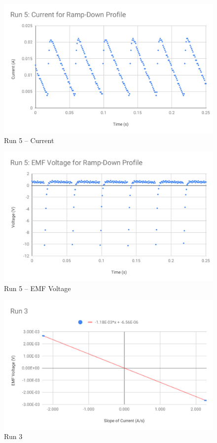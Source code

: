 %
\begin{figure}[ht]
	\centering
	\includegraphics[scale=0.74]{image/04-faraday/run-5-I.pdf}
	\caption{Run 5 -- Current}
	\label{figure.04.run.5.I}
\end{figure}
%
\begin{figure}[ht]
	\centering
	\includegraphics[scale=0.74]{image/04-faraday/run-5-V.pdf}
	\caption{Run 5 -- EMF Voltage}
	\label{figure.04.run.5.V}
\end{figure}
%
\begin{figure}[ht]
	\centering
	\includegraphics[scale=0.74]{image/04-faraday/run-3.pdf}
	\caption{Run 3}
	\label{figure.04.run.3}
\end{figure}